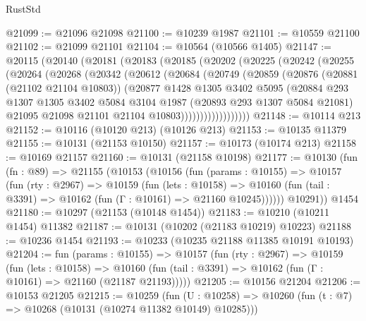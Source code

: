 \begin{lexlean}{RustStd}
\begin{coremodule}
@21099 := @21096 @21098
@21100 := @10239 @1987
@21101 := @10559 @21100
@21102 := @21099 @21101
@21104 := @10564 (@10566 @1405)
@21147 := @20115
    (@20140
      (@20181
        (@20183
          (@20185
            (@20202
              (@20225
                (@20242
                  (@20255
                    (@20264
                      (@20268
                        (@20342
                          (@20612
                            (@20684
                              (@20749
                                (@20859
                                  (@20876
                                    (@20881 (@21102 @21104 @10803))
                                    (@20877
                                      @1428
                                      @1305
                                      @3402
                                      @5095
                                      (@20884
                                        @293
                                        @1307
                                        @1305
                                        @3402
                                        @5084
                                        @3104
                                        @1987
                                        (@20893 @293 @1307 @5084 @21081)
                                        @21095
                                        @21098
                                        @21101
                                        @21104
                                        @10803))))))))))))))))))
@21148 := @10114 @213
@21152 := @10116 (@10120 @213) (@10126 @213)
@21153 := @10135 @11379
@21155 := @10131 (@21153 @10150)
@21157 := @10173 (@10174 @213)
@21158 := @10169 @21157
@21160 := @10131 (@21158 @10198)
@21177 := @10130
    (fun (fn : @89) =>
    @21155
      (@10153
        (@10156
          (fun (params : @10155) =>
          @10157
            (fun (rty : @2967) =>
            @10159
              (fun (lets : @10158) =>
              @10160 (fun (tail : @3391) => @10162 (fun (Γ : @10161) => @21160 @10245))))))
        @10291))
    @1454
@21180 := @10297 (@21153 (@10148 @1454))
@21183 := @10210 (@10211 @1454) @11382
@21187 := @10131 (@10202 (@21183 @10219) @10223)
@21188 := @10236 @1454
@21193 := @10233 (@10235 @21188 @11385 @10191 @10193)
@21204 := fun (params : @10155) =>
  @10157
    (fun (rty : @2967) =>
    @10159
      (fun (lets : @10158) =>
      @10160 (fun (tail : @3391) => @10162 (fun (Γ : @10161) => @21160 (@21187 @21193)))))
@21205 := @10156 @21204
@21206 := @10153 @21205
@21215 := @10259
    (fun (U : @10258) => @10260 (fun (t : @7) => @10268 (@10131 (@10274 @11382 @10149) @10285)))

\end{coremodule}
\end{lexlean}
